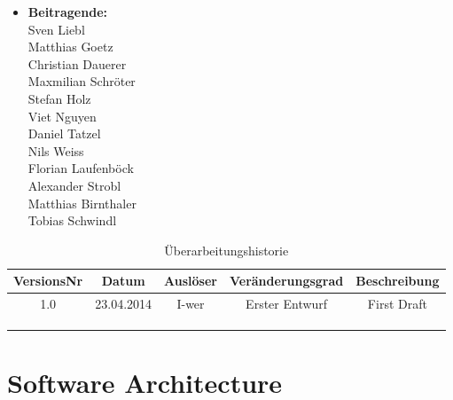 \documentclass[10pt,a4paper]{scrartcl}
\begin{document}


\newpage
\begin{itemize}
\item[] \textbf{\large Beitragende:}\\
Sven Liebl\\
Matthias Goetz\\
Christian Dauerer\\
Maxmilian Schröter\\
Stefan Holz\\
Viet Nguyen\\
Daniel Tatzel\\
Nils Weiss\\
Florian Laufenböck\\
Alexander Strobl\\
Matthias Birnthaler\\
Tobias Schwindl
\end{itemize}

\bigskip

\begin{table}[!h]
 	\centering
	\begin{tabular}{|c|c|c|c||c|} 
	\hline
	\textbf{VersionsNr} &  \textbf{Datum} & \textbf{Auslöser} & \textbf{Veränderungsgrad} & \textbf{Beschreibung} \\
	\hline
	1.0 & 23.04.2014 & I-wer & Erster Entwurf & First Draft \\
	\hline
	\text{ } & \text{ } & \text{ } & \text{ } & \text{ } \\
	\hline
	\text{ } & \text{ } & \text{ } & \text{ } & \text{ } \\
	\hline
	\text{ } & \text{ } & \text{ } & \text{ } & \text{ } \\
	\hline
	\end{tabular}

\caption{Überarbeitungshistorie}
\end{table}

\newpage
\tableofcontents

\section{Software Architecture}
\end{document}
